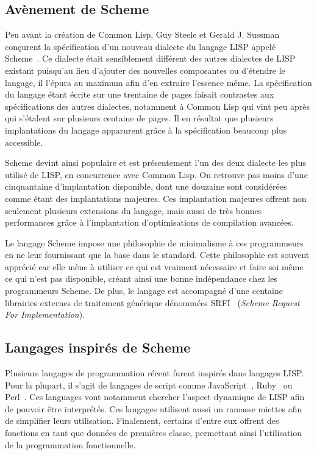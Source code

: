 \documentclass[12pt,oneside,letterpaper,francais]{book}
\begin{document}
\subsection{Avènement de Scheme}
Peu avant la création de Common Lisp, Guy Steele et Gerald J. Sussman
conçurent la spécification d'un nouveau dialecte du langage LISP
appelé Scheme~\cite{SCHEME_ORIGINS}. Ce dialecte était sensiblement
différent des autres dialectes de LISP existant puisqu'au lieu
d'ajouter des nouvelles composantes ou d'étendre le langage, il
l'épura au maximum afin d'en extraire l'essence même. La spécification
du langage étant écrite sur une trentaine de pages faisait contrastes
aux spécifications des autres dialectes, notamment à Common Lisp qui
vint peu après qui s'étalent sur plusieurs centaine de pages. Il en
résultat que plusieurs implantations du langage apparurent grâce à la
spécification beaucoup plus accessible.

Scheme devint ainsi populaire et est présentement l'un des deux
dialecte les plus utilisé de LISP, en concurrence avec Common Lisp. On
retrouve pas moins d'une cinquantaine d'implantation disponible, dont
une douzaine sont considérées comme étant des implantations
majeures. Ces implantation majeures offrent non seulement plusieurs
extensions du langage, mais aussi de très bonnes performances grâce à
l'implantation d'optimisations de compilation avancées.

Le langage Scheme impose une philosophie de minimalisme à ces
programmeurs en ne leur fournissant que la base dans le
standard. Cette philosophie est souvent apprécié car elle mène à
utiliser ce qui est vraiment nécessaire et faire soi même ce qui n'est
pas disponible, créant ainsi une bonne indépendance chez les
programmeurs Scheme. De plus, le langage est accompagné d'une centaine
librairies externes de traitement générique dénommées SRFI~\cite{SRFI}
(\textit{Scheme Request For Implementation}).

\subsection{Langages inspirés de Scheme}

Plusieurs langages de programmation récent furent inspirés dans
langages LISP. Pour la plupart, il s'agit de langages de script comme
JavaScript~\cite{ECMA-262}, Ruby~\cite{RUBY} ou Perl~\cite{PERL}. Ces
languages vont notamment chercher l'aspect dynamique de LISP afin de
pouvoir être interprétés. Ces langages utilisent aussi un ramasse
miettes afin de simplifier leurs utilisation. Finalement, certains
d'entre eux offrent des fonctions en tant que données de premières
classe, permettant ainsi l'utilisation de la programmation
fonctionnelle. 
\end{document}
